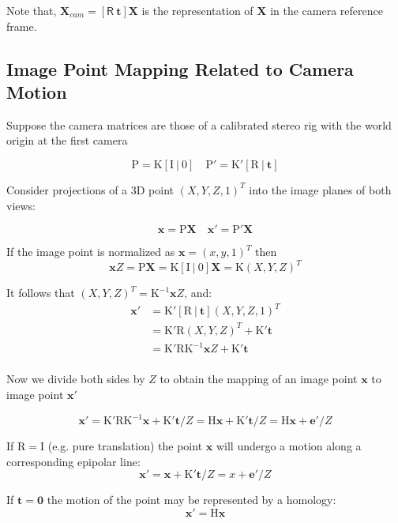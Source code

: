 \documentclass{bmvc2k}
\begin{document}
Note that, $ \mathbf{X}_{cam}= [\mathsf{R}\ \mathbf{t}]\mathbf{X}$ is the
representation of $\mathbf{X}$ in the camera reference frame.

\subsection{Image Point Mapping Related to Camera Motion}

Suppose the camera matrices are those of a calibrated stereo rig with
the world origin at the first camera

\[
\mathrm{P = K[I\ |\ 0]\quad P'=K'[R\ |\ \mathbf{t}]}
\]

Consider projections of a 3D point $(X,Y,Z,1)^T$ into the image planes of both views:

\[
\mathrm{\mathbf{x} = P\mathbf{X} \quad \mathbf{x}' = P'\mathbf{X}}
\]

If the image point is normalized as $\mathbf{x} = (x,y,1)^T$ then
\[
\mathbf{x}Z = \mathrm{P\mathbf{X} = K[I\ |\ 0]\mathbf{X} = K}(X,Y,Z)^T
\]

It follows that $(X,Y,Z)^T = \mathrm{K^{-1}}\mathbf{x}Z$, and:
\begin{align}
  \mathbf{x}' &= \mathrm{K'[R\ |\ \mathbf{t}]}(X,Y,Z,1)^T \\
  &= \mathrm{K'R}(X,Y,Z)^T + \mathrm{K'\mathbf{t}}\\
  &= \mathrm{K'RK^{-1}}\mathbf{x}Z + \mathrm{K'\mathbf{t}}\\
\end{align}

Now we divide both sides by $Z$ to obtain the mapping of an image point $\mathbf{x}$ to image point $\mathbf{x}'$

\begin{equation}
  \label{eq:point_motion}
  \mathbf{x}' = \mathrm{K'RK^{-1}}\mathbf{x} + \mathrm{K'}\mathbf{t}/Z = \mathrm{H}\mathbf{x}+ \mathrm{K'}\mathbf{t}/Z = \mathrm{H}\mathbf{x} + \mathbf{e'}/Z
\end{equation}

If $\mathrm{R = I}$ (e.g. pure translation) the point $\mathbf{x}$ will undergo a motion along a corresponding epipolar line:
\begin{equation}
\mathbf{x}' = \mathbf{x}+ \mathrm{K'}\mathbf{t}/Z = x+\mathbf{e}'/Z
\end{equation}

If $\mathbf{t} = \mathbf{0}$ the motion of the point may be represented by a homology:
\[
\mathbf{x}' = \mathrm{H}\mathbf{x}
\]
\end{document}
